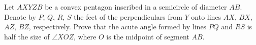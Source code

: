 Let $AXYZB$ be a convex pentagon inscribed in a semicircle of diameter $AB$. Denote by
$P$, $Q$, $R$, $S$ the feet of the perpendiculars from $Y$ onto lines $AX$, $BX$, $AZ$, $BZ$, respectively.  Prove that the acute angle formed by lines $PQ$ and $RS$ is half the size of $\angle XOZ$, where $O$ is the midpoint of segment $AB$.